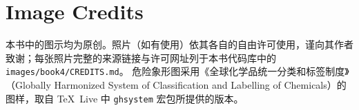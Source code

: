 \chapter*{Image Credits}

本书中的图示均为原创。照片（如有使用）依其各自的自由许可使用，谨向其作者致谢；每张照片完整的来源链接与许可网址列于本书代码库中的 \texttt{images/book4/CREDITS.md}。
危险象形图采用《全球化学品统一分类和标签制度》（Globally Harmonized System of Classification and Labelling of Chemicals）的图样，取自 \TeX\ Live 中 \texttt{ghsystem} 宏包所提供的版本。

